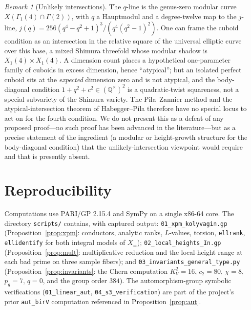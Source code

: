 \documentclass[11pt,reqno]{amsart}
\theoremstyle{plain}
\theoremstyle{definition}
\theoremstyle{remark}
\newtheorem{remark}[theorem]{Remark}
\newcommand{\Q}{\mathbb{Q}}
\begin{document}
\begin{remark}[Unlikely intersections]\label{rem:pz}
The $q$-line is the genus-zero modular curve $X(\Gamma_1(4)\cap\Gamma(2))$, with $q$
a Hauptmodul and a degree-twelve map to the $j$-line,
$j(q)=256(q^4-q^2+1)^3/(q^4(q^2-1)^2)$. One can frame the cuboid condition as an
intersection in the relative square of the universal elliptic curve over this base, a
mixed Shimura threefold whose modular shadow is $X_1(4)\times X_1(4)$. A dimension
count places a hypothetical one-parameter family of cuboids in excess dimension, hence
``atypical''; but an isolated perfect cuboid sits at the \emph{expected} dimension
zero and is not atypical, and the body-diagonal condition $1+q^2+c^2\in(\Q^\times)^2$
is a quadratic-twist squareness, not a special subvariety of the Shimura variety.
The Pila--Zannier method \cite{PilaZannier} and the atypical-intersection theorem of
Habegger--Pila \cite{HabeggerPila} therefore have no special locus to act on for the
fourth condition. We do not present this as a defeat of any proposed proof---no such
proof has been advanced in the literature---but as a precise statement of the
ingredient (a modular or height-growth structure for the body-diagonal condition)
that the unlikely-intersection viewpoint would require and that is presently absent.
\end{remark}

\section{Reproducibility}\label{sec:repro}

Computations use PARI/GP 2.15.4 \cite{PARI} and SymPy on a single x86-64 core. The
directory \texttt{scripts/} contains, with captured output:
\texttt{01\_xpm\_kolyvagin.gp} (Proposition~\ref{prop:xpm}: conductors, analytic
ranks, $L$-values, torsion, \texttt{ellrank}, \texttt{ellidentify} for both integral
models of $X_\pm$); \texttt{02\_local\_heights\_In.gp}
(Proposition~\ref{prop:mult}: multiplicative reduction and the local-height range at
each bad prime on three sample fibers); and
\texttt{03\_invariants\_general\_type.py} (Proposition~\ref{prop:invariants}: the
Chern computation $K_V^2=16$, $c_2=80$, $\chi=8$, $p_g=7$, $q=0$, and the group
order $384$). The automorphism-group symbolic verifications
(\texttt{01\_linear\_aut}, \texttt{04\_s3\_verification}) are part of the project's
prior \texttt{aut\_birV} computation referenced in Proposition~\ref{prop:aut}.
\end{document}
